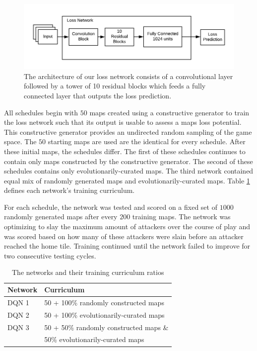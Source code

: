 \documentclass[letterpaper]{article} %
\begin{document}
\begin{figure}[tb]
\begin{center}
\includegraphics[width=1.0\linewidth]{graphics/loss-network.png}
\caption{The architecture of our loss network consists of a convolutional layer followed by a tower of 10 residual blocks which feeds a fully connected layer that outputs the loss prediction.}
\label{fig:loss-network-diagram}
\end{center}
\end{figure}

All schedules begin with $50$ maps created using a constructive generator to train the loss network such that its output is usable to assess a maps loss potential. This constructive generator provides an undirected random sampling of the game space. The $50$ starting maps are used are the identical for every schedule. After these initial maps, the schedules differ. The first of these schedules continues to contain only maps constructed by the constructive generator. The second of these schedules contains only evolutionarily-curated maps. The third network contained equal mix of randomly generated maps and evolutionarily-curated maps. Table \ref{table:networks} defines each network's training curriculum.

For each schedule, the network was tested and scored on a fixed set of $1000$ randomly generated maps after every $200$ training maps. The network was optimizing to slay the maximum amount of attackers over the course of play and was scored based on how many of these attackers were slain before an attacker reached the home tile. Training continued until the network failed to improve for two consecutive testing cycles.

\begin{table}[]
\begin{tabular}{|l|l|}
\hline
\textbf{Network} & \textbf{Curriculum} \\ \hline
DQN 1  & 50 + 100\% randomly constructed maps\\ \hline
DQN 2  & 50 + 100\% evolutionarily-curated maps\\ \hline
DQN 3  & 50 + 50\% randomly constructed maps \& \\
       & 50\% evolutionarily-curated maps\\ \hline
\end{tabular}
\caption{The networks and their training curriculum ratios}
\label{table:networks}
\end{table}
\end{document}
